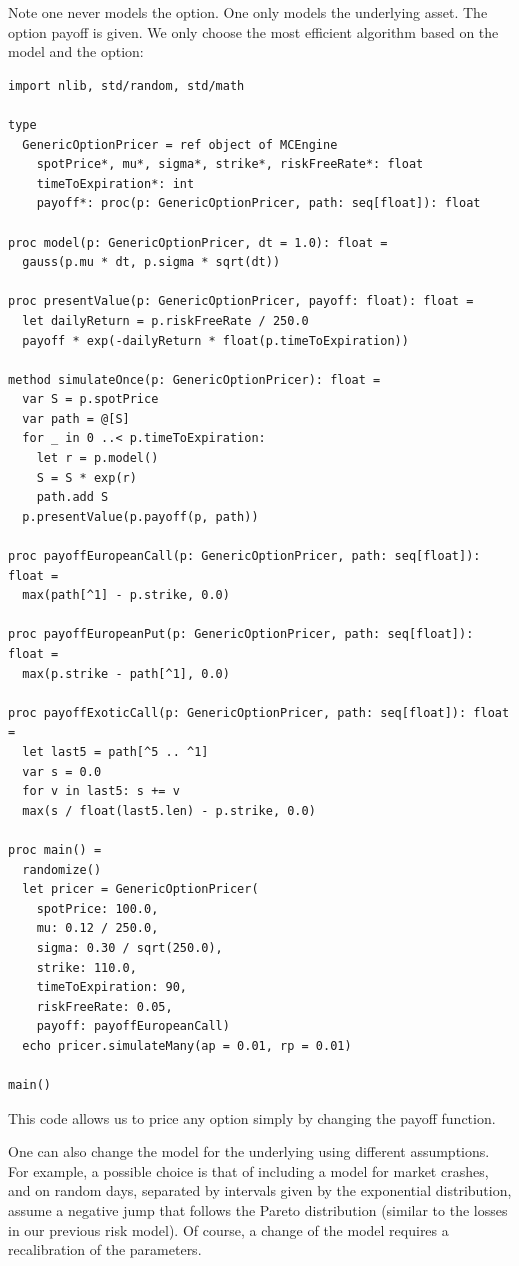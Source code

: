 \documentclass[justified, sixbynine]{tufte-book}
\def\ft{\small\tt}
\theoremstyle{plain}%
\newtheorem * {corollary}{Corollary}
\theoremstyle{definition}
\theoremstyle{remark}
\newtheorem * {remark}{Remark}
\newtheorem * {note}{Note}
\begin{document}
\begin{fullwidth}
Note one never models the option. One only models the underlying asset. The option payoff is given. We only choose the most efficient algorithm based on the model and the option:

\begin{lstlisting}[caption={in file: {\ft options.nim}}]
import nlib, std/random, std/math

type
  GenericOptionPricer = ref object of MCEngine
    spotPrice*, mu*, sigma*, strike*, riskFreeRate*: float
    timeToExpiration*: int
    payoff*: proc(p: GenericOptionPricer, path: seq[float]): float

proc model(p: GenericOptionPricer, dt = 1.0): float =
  gauss(p.mu * dt, p.sigma * sqrt(dt))

proc presentValue(p: GenericOptionPricer, payoff: float): float =
  let dailyReturn = p.riskFreeRate / 250.0
  payoff * exp(-dailyReturn * float(p.timeToExpiration))

method simulateOnce(p: GenericOptionPricer): float =
  var S = p.spotPrice
  var path = @[S]
  for _ in 0 ..< p.timeToExpiration:
    let r = p.model()
    S = S * exp(r)
    path.add S
  p.presentValue(p.payoff(p, path))

proc payoffEuropeanCall(p: GenericOptionPricer, path: seq[float]): float =
  max(path[^1] - p.strike, 0.0)

proc payoffEuropeanPut(p: GenericOptionPricer, path: seq[float]): float =
  max(p.strike - path[^1], 0.0)

proc payoffExoticCall(p: GenericOptionPricer, path: seq[float]): float =
  let last5 = path[^5 .. ^1]
  var s = 0.0
  for v in last5: s += v
  max(s / float(last5.len) - p.strike, 0.0)

proc main() =
  randomize()
  let pricer = GenericOptionPricer(
    spotPrice: 100.0,
    mu: 0.12 / 250.0,
    sigma: 0.30 / sqrt(250.0),
    strike: 110.0,
    timeToExpiration: 90,
    riskFreeRate: 0.05,
    payoff: payoffEuropeanCall)
  echo pricer.simulateMany(ap = 0.01, rp = 0.01)

main()
\end{lstlisting}

This code allows us to price any option simply by changing the payoff function.

One can also change the model for the underlying using different assumptions. For example, a possible choice is that of including a model for market crashes, and on random days, separated by intervals given by the exponential distribution, assume a negative jump that follows the Pareto distribution (similar to the losses in our previous risk model). Of course, a change of the model requires a recalibration of the parameters.


\end{fullwidth}
\end{document}
